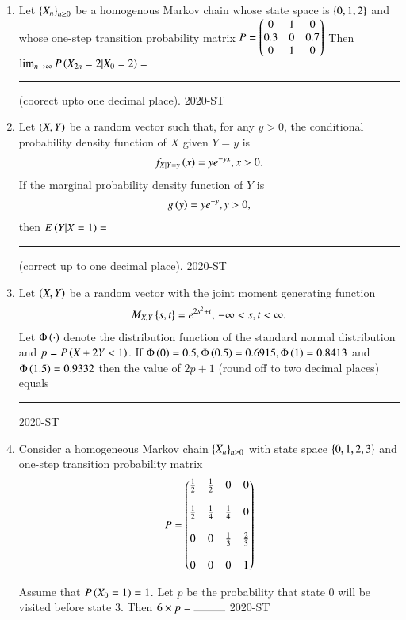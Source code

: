 \documentclass[journal,12pt,onecolumn]{IEEEtran}
\theoremstyle{remark}
\begin{document}
\begin{enumerate}
\item Let $\left\{X_n\right\}_{n\geq 0}$ be a homogenous Markov chain whose state space is $\left\{0, 1, 2\right\}$ and whose one-step transition probability matrix
$P=\begin{pmatrix} 0 & 1 & 0 \\
	   0.3 & 0 & 0.7 \\
	   0 & 1 & 0\end{pmatrix}$ Then $\lim_{n\to \infty}P\left(X_{2n}=2 \vert X_{0} =2\right)=$ \rule{1cm}{0.2pt} (coorect upto one decimal place).
\hfill{2020-ST}


\item Let $\left(X, Y\right)$ be a random vector such that, for any $y>0$, the conditional probability density function of $X$ given $Y=y$ is
	\begin{align*}
		f_{X|Y=y}\left(x\right) = y e^{-yx}, x > 0.
	\end{align*}
If the marginal probability density function of $Y$ is
	\begin{align*}
		g\left(y\right) = y e^{-y}, y > 0,
	\end{align*}
then $E\left(Y|X=1\right)=$ \rule{1cm}{0.2pt} (correct up to one decimal place).
\hfill{2020-ST}


\item Let $\left(X, Y\right)$ be a random vector with the joint moment generating function
	\begin{align*}
         M_{X,Y}\left\{s, t\right\} = e^{2s^2 + t}, \, -\infty < s, t < \infty.
	\end{align*}
     Let $\Phi\left(\cdot\right)$ denote the distribution function of the standard normal distribution and $p=P\left(X+2Y<1\right)$. If $\Phi\left(0\right)=0.5, \Phi\left(0.5\right)=0.6915, \Phi\left(1\right)=0.8413$ and $\Phi\left(1.5\right)=0.9332$ then the value of $2p+1$ (round off to two decimal places) equals \rule{1cm}{0.2pt}
\hfill{2020-ST}


\item Consider a homogeneous Markov chain $ \left\{X_n\right\}_{n \geq 0} $ with state space $ \left\{ 0, 1, 2, 3 \right\} $ and one-step transition probability matrix
	\begin{align*}
	P =  \begin{pmatrix} \frac{1}{2} & \frac{1}{2} & 0 & 0 \\ \\
		  \frac{1}{2} & \frac{1}{4} & \frac{1}{4} & 0 \\ \\
		   0 & 0 & \frac{1}{3} & \frac{2}{3} \\ \\
			0 & 0 & 0 & 1\end{pmatrix}
	\end{align*}
	

 Assume that $ P\left(X_0 = 1\right) = 1 $. Let $ p $ be the probability that state 0 will be visited before state 3. Then $ 6 \times p = \rule{1cm}{0.2pt} $
\hfill{2020-ST}



\end{enumerate}
\end{document}
